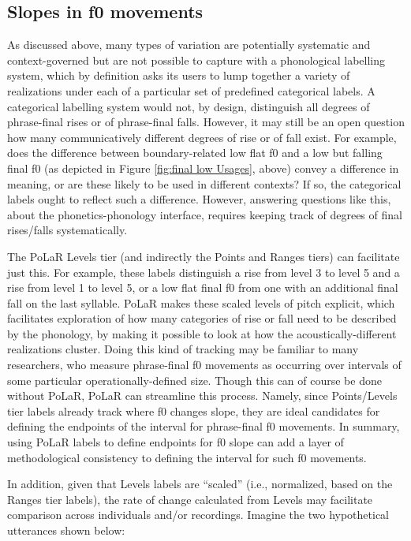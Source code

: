 \subsection{Slopes in f0 movements}\label{sec:pitch-slopes}
As discussed above, many types of variation are potentially systematic and context-governed but are not possible to capture with a phonological labelling system, which by definition asks its users to lump together a variety of realizations under each of a particular set of predefined categorical labels. A categorical labelling system would not, by design, distinguish all degrees of phrase-final rises or of phrase-final falls. However, it may still be an open question how many communicatively different degrees of rise or of fall exist. For example, does the difference between boundary-related low flat f0 and a low but falling final f0 (as depicted in Figure \ref{fig:final low Usages}, above) convey a difference in meaning, or are these likely to be used in different contexts? If so, the categorical labels ought to reflect such a difference. However, answering questions like this, about the phonetics-phonology interface, requires keeping track of degrees of final rises\slash falls systematically.

The PoLaR Levels tier (and indirectly the Points and Ranges tiers) can facilitate just this. For example, these labels distinguish a rise from level 3 to level 5 and a rise from level 1 to level 5, or a low flat final f0 from one with an additional final fall on the last syllable. PoLaR makes these scaled levels of pitch explicit, which facilitates exploration of how many categories of rise or fall need to be described by the phonology, by making it possible to look at how the acoustically-different realizations cluster. Doing this kind of tracking may be familiar to many researchers, who measure phrase-final f0 movements as occurring over intervals of some particular operationally-defined size. Though this can of course be done without PoLaR, PoLaR can streamline this process. Namely, since Points\slash Levels tier labels already track where f0 changes slope, they are ideal candidates for defining the endpoints of the interval for phrase-final f0 movements. In summary, using PoLaR labels to define endpoints for f0 slope can add a layer of methodological consistency to defining the interval for such f0 movements.

In addition, given that Levels labels are “scaled” (i.e., normalized, based on the Ranges tier labels), the rate of change calculated from Levels may facilitate comparison across individuals and/or recordings. Imagine the two hypothetical utterances shown below:

